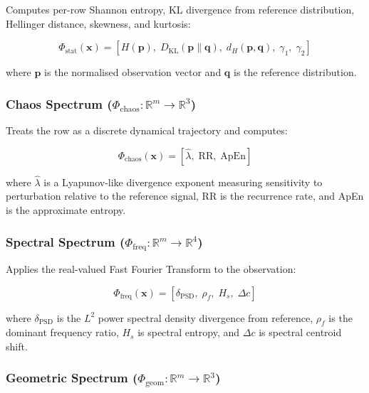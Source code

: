 \documentclass[journal]{IEEEtran}
\newcommand{\R}{\mathbb{R}}
\begin{document}
Computes per-row Shannon entropy, KL divergence from reference distribution, Hellinger distance, skewness, and kurtosis:

\begin{equation}
\Phi_{\text{stat}}(\mathbf{x}) = \left[H(\mathbf{p}),\; D_{\text{KL}}(\mathbf{p}\|\mathbf{q}),\; d_H(\mathbf{p},\mathbf{q}),\; \gamma_1,\; \gamma_2\right]
\label{eq:phi_stat}
\end{equation}

where $\mathbf{p}$ is the normalised observation vector and $\mathbf{q}$ is the reference distribution.

\subsubsection{Chaos Spectrum ($\Phi_{\text{chaos}}: \R^m \to \R^3$)}

Treats the row as a discrete dynamical trajectory and computes:

\begin{equation}
\Phi_{\text{chaos}}(\mathbf{x}) = \left[\hat{\lambda},\; \text{RR},\; \text{ApEn}\right]
\label{eq:phi_chaos}
\end{equation}

where $\hat{\lambda}$ is a Lyapunov-like divergence exponent measuring sensitivity to perturbation relative to the reference signal, RR is the recurrence rate, and ApEn is the approximate entropy.

\subsubsection{Spectral Spectrum ($\Phi_{\text{freq}}: \R^m \to \R^4$)}

Applies the real-valued Fast Fourier Transform to the observation:

\begin{equation}
\Phi_{\text{freq}}(\mathbf{x}) = \left[\delta_{\text{PSD}},\; \rho_f,\; H_s,\; \Delta c\right]
\label{eq:phi_freq}
\end{equation}

where $\delta_{\text{PSD}}$ is the $L^2$ power spectral density divergence from reference, $\rho_f$ is the dominant frequency ratio, $H_s$ is spectral entropy, and $\Delta c$ is spectral centroid shift.

\subsubsection{Geometric Spectrum ($\Phi_{\text{geom}}: \R^m \to \R^3$)}
\end{document}
